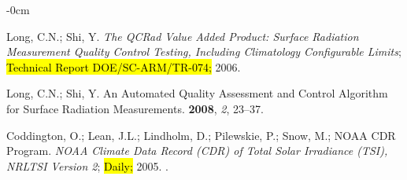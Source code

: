 \documentclass[applsci,article,accept,moreauthors,pdftex]{Definitions/mdpi}
\begin{document}
\begin{adjustwidth}{-\extralength}{0cm}
\begin{thebibliography}{999}




Long, C.N.; Shi, Y.
\newblock \emph{The QCRad Value Added Product: Surface Radiation Measurement Quality
  Control Testing, Including Climatology Configurable Limits};
\newblock \hl{Technical Report DOE/SC-ARM/TR-074;} %
  2006.

Long, C.N.; Shi, Y.
\newblock An Automated Quality Assessment and Control Algorithm for Surface
  Radiation Measurements.
 {\bf 2008}, \emph{2}, 23--37.

Coddington, O.; Lean, J.L.; Lindholm, D.; Pilewskie, P.; Snow, M.; {NOAA CDR
  Program}.
\newblock \emph{{NOAA} Climate Data Record ({CDR}) of Total Solar Irradiance ({TSI}),
  {NRLTSI} Version 2}; \hl{{D}aily;} %
  2005.
.




\end{thebibliography}
\end{adjustwidth}
\end{document}
